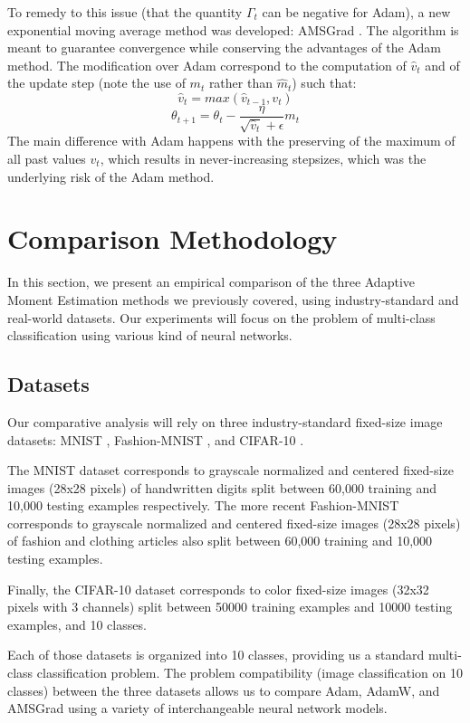 \documentclass{article} %
\begin{document}
To remedy to this issue (that the quantity $\Gamma_t$ can be negative for Adam), a new exponential 
moving average method was developed: AMSGrad \citep{reddi2019convergence}. The algorithm is meant 
to guarantee convergence while conserving the advantages of the Adam method. The modification over 
Adam correspond to the computation of $\hat{v}_t$ and of the update step (note the use of $m_t$ 
rather than $\hat{m}_t$) such that:
$$\hat{v}_t = {max}(\hat{v}_{t-1}, v_t)$$
$$\theta_{t+1} = \theta_t-\frac{\eta}{\sqrt{\hat{v}_t}+\epsilon}m_t$$
The main difference with Adam happens with the preserving of the maximum of all past values $v_t$,
which results in never-increasing stepsizes, which was the underlying risk of the Adam method.

\section{Comparison Methodology}
\label{method}

In this section, we present an empirical comparison of the three Adaptive Moment Estimation 
methods we previously covered, using industry-standard and real-world datasets. Our experiments 
will focus on the problem of multi-class classification using various kind of neural networks.

\subsection{Datasets}

Our comparative analysis will rely on three industry-standard fixed-size image datasets: MNIST 
\citep{mnist}, Fashion-MNIST \citep{xiao2017/online}, and CIFAR-10 \citep{cifar}.

The MNIST dataset corresponds to grayscale normalized and centered fixed-size images (28x28 
pixels) of handwritten digits split between 60,000 training and 10,000 testing examples 
respectively. The more recent Fashion-MNIST corresponds to grayscale normalized and centered 
fixed-size images (28x28 pixels) of fashion and clothing articles also split between 60,000 
training and 10,000 testing examples.

Finally, the CIFAR-10 dataset corresponds to color fixed-size images (32x32 pixels with 3 channels) 
split between 50000 training examples and 10000 testing examples, and 10 classes.

Each of those datasets is organized into 10 classes, providing us a standard multi-class 
classification problem. The problem compatibility (image classification on 10 classes) between the 
three datasets allows us to compare Adam, AdamW, and AMSGrad using a variety of interchangeable 
neural network models.
\end{document}
